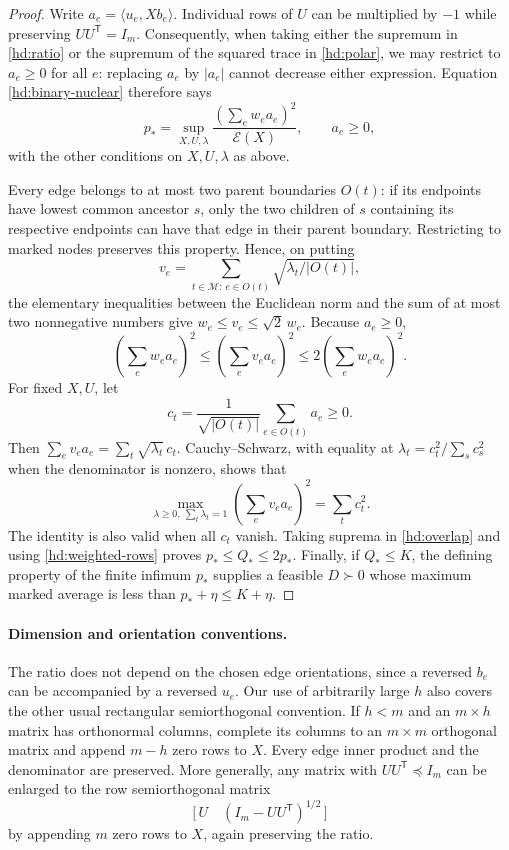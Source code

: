 \documentclass[11pt]{amsart}
\theoremstyle{definition}
\theoremstyle{remark}
\numberwithin{equation}{section}
\begin{document}
\begin{proof}
Write $a_e=\langle u_e,Xb_e\rangle$.  Individual rows of $U$ can be
multiplied by $-1$ while preserving $UU^{\mathsf T}=I_m$.
Consequently, when taking either the supremum in \eqref{hd:ratio} or
the supremum of the squared trace in \eqref{hd:polar}, we may restrict
to $a_e\geq0$ for all $e$: replacing $a_e$ by $|a_e|$ cannot decrease
either expression.  Equation \eqref{hd:binary-nuclear} therefore says
\begin{equation}
\label{hd:weighted-rows}
 p_*=
 \sup_{X,U,\lambda}
 \frac{\left(\sum_e w_ea_e\right)^2}{\mathcal E(X)},
 \qquad a_e\geq0,
\end{equation}
with the other conditions on $X,U,\lambda$ as above.

Every edge belongs to at most two parent boundaries $O(t)$: if its
endpoints have lowest common ancestor $s$, only the two children of
$s$ containing its respective endpoints can have that edge in their
parent boundary.  Restricting to marked nodes preserves this property.
Hence, on putting
\[
 v_e=\sum_{t\in\mathcal M:\ e\in O(t)}
                    \sqrt{\lambda_t/|O(t)|},
\]
the elementary inequalities between the Euclidean norm and the sum
of at most two nonnegative numbers give
$w_e\leq v_e\leq\sqrt2\,w_e$.  Because $a_e\geq0$,
\begin{equation}
\label{hd:overlap}
 \left(\sum_e w_ea_e\right)^2
 \leq\left(\sum_e v_ea_e\right)^2
 \leq2\left(\sum_e w_ea_e\right)^2.
\end{equation}
For fixed $X,U$, let
\[
 c_t=\frac1{\sqrt{|O(t)|}}\sum_{e\in O(t)}a_e\geq0.
\]
Then $\sum_e v_ea_e=\sum_t\sqrt{\lambda_t}\,c_t$.
Cauchy--Schwarz, with equality at
$\lambda_t=c_t^2/\sum_s c_s^2$ when the denominator is nonzero,
shows that
\[
 \max_{\lambda\geq0,\ \sum_t\lambda_t=1}
       \left(\sum_e v_ea_e\right)^2
   =\sum_t c_t^2.
\]
The identity is also valid when all $c_t$ vanish.  Taking suprema in
\eqref{hd:overlap} and using \eqref{hd:weighted-rows} proves
$p_*\leq Q_*\leq2p_*$.  Finally, if $Q_*\leq K$, the defining
property of the finite infimum $p_*$ supplies a feasible $D\succ0$
whose maximum marked average is less than $p_*+\eta\leq K+\eta$.
\end{proof}

\paragraph{Dimension and orientation conventions.}
The ratio does not depend on the chosen edge orientations, since a
reversed $b_e$ can be accompanied by a reversed $u_e$.  Our use of
arbitrarily large $h$ also covers the other usual rectangular
semiorthogonal convention.  If $h<m$ and an $m\times h$ matrix has
orthonormal columns, complete its columns to an $m\times m$ orthogonal
matrix and append $m-h$ zero rows to $X$.  Every edge inner product
and the denominator are preserved.  More generally, any matrix with
$UU^{\mathsf T}\preceq I_m$ can be enlarged to the row semiorthogonal
matrix
\[
 \bigl[\,U\quad (I_m-UU^{\mathsf T})^{1/2}\,\bigr]
\]
by appending $m$ zero rows to $X$, again preserving the ratio.
\end{document}
